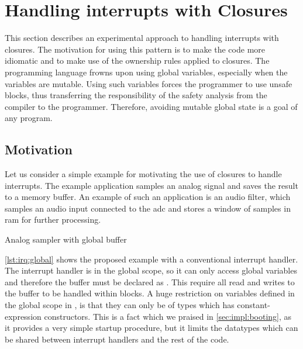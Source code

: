 \section{Handling interrupts with Closures}
\label{sec:irq-closures}

This section describes an experimental approach to handling interrupts with closures.
The motivation for using this pattern is to make the code more {\rust} idiomatic and to make use of the ownership rules applied to closures.
The {\rust} programming language frowns upon using global variables, especially when the variables are mutable.
Using such variables forces the programmer to use unsafe blocks, thus transferring the responsibility of the safety analysis from the compiler to the programmer.
Therefore, avoiding mutable global state is a goal of any {\rust} program.

\subsection{Motivation}
\label{sec:irq:motivation}

Let us consider a simple example for motivating the use of closures to handle interrupts.
The example application samples an analog signal and saves the result to a memory buffer.
An example of such an application is an audio filter, which samples an audio input connected to the \gls{adc} and stores a window of samples in \gls{ram} for further processing.

\begin{listing}[H]
  \caption{Analog sampler with global buffer}
  \label{lst:irq:global}
\end{listing}

\autoref{lst:irq:global} shows the proposed example with a conventional interrupt handler.
The interrupt handler is in the global scope, so it can only access global variables and therefore the buffer must be declared as .
This require all read and writes to the buffer to be handled within  blocks.
A huge restriction on variables defined in the global scope in {\rust}, is that they can only be of types which has constant-expression constructors.
This is a fact which we praised in \autoref{sec:impl:booting}, as it provides a very simple startup procedure, but it limits the datatypes which can be shared between interrupt handlers and the rest of the code.

